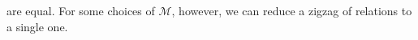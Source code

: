 \documentclass[11pt,a4paper]{article}
\theoremstyle{plain}
\newtheorem{proposition}[theorem]{Proposition}
\theoremstyle{definition}
\newcommand{\C}{\mathscr{C}}
\newcommand{\M}{\mathscr{M}}
\newcommand{\id}{\mathrm{id}}
\newcommand{\rep}[2]{{\ensuremath \left\langle #1 \mid #2 \right\rangle}}
\newcommand{\fget}{\textsc{Get}}
\newcommand{\fput}{\textsc{Put}}
\newcommand{\hto}{\ensuremath{\,\mathaccent\shortmid\rightarrow\,}}
\newcommand{\todo}[1]{\textcolor{red}{\small #1}}
\begin{document}
%
are equal. For some choices of $\M$, however, we can reduce a zigzag of relations to a single one.
%
%
%
%
\end{document}
